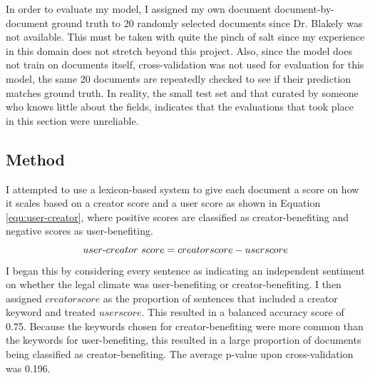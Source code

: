 			In order to evaluate my model, I assigned my own document document-by-document ground truth to 20 randomly selected documents since Dr. Blakely was not available. This must be taken with quite the pinch of salt since my experience in this domain does not stretch beyond this project. Also, since the model does not train on documents itself, cross-validation was not used for evaluation for this model, the same 20 documents are repeatedly checked to see if their prediction matches ground truth. In reality, the small test set and that curated by someone who knows little about the fields, indicates that the evaluations that took place in this section were unreliable.
		\subsection{Method}
			I attempted to use a lexicon-based system to give each document a score on how it scales based on a creator score and a user score as shown in Equation \ref{equ:user-creator}, where positive scores are classified as creator-benefiting and negative scores as user-benefiting.                              
			\begin{equation}\label{equ:user-creator}
				user\textnormal{-}creator\textnormal{ }score = creatorscore - userscore
			\end{equation}
			I began this by considering every sentence as indicating an independent sentiment on whether the legal climate was user-benefiting or creator-benefiting. I then assigned $creatorscore$ as the proportion of sentences that included a creator keyword and treated $userscore$. This resulted in a balanced accuracy score of 0.75. Because the keywords chosen for creator-benefiting were more common than the keywords for user-benefiting, this resulted in a large proportion of documents being classified as creator-benefiting. The average p-value upon cross-validation was 0.196. 
			

